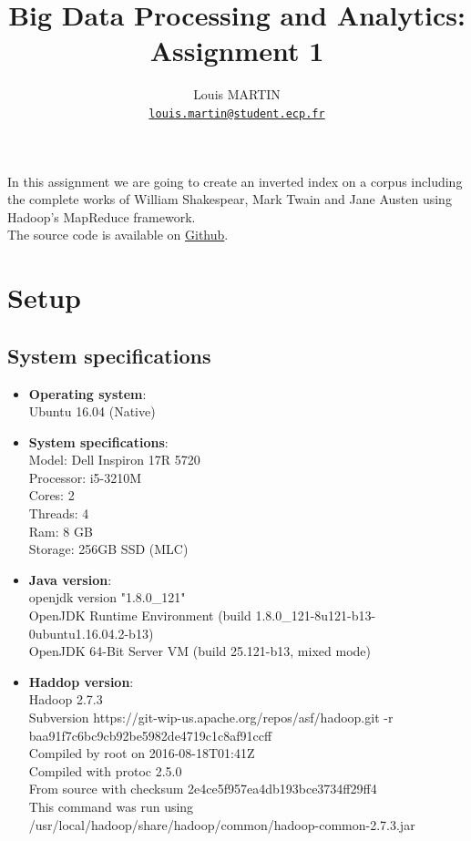 \documentclass[a4paper,10pt]{article}
\begin{document}
\title{Big Data Processing and Analytics: Assignment 1}
\author{Louis MARTIN\\
\href{mailto:louis.martin@student.ecp.fr}{\tt louis.martin@student.ecp.fr}}

\maketitle

In this assignment we are going to create an inverted index on a corpus
including the complete works of William Shakespear, Mark Twain and Jane Austen
using Hadoop's MapReduce framework.
\\The source code is available on \href{https://github.com/louismartin/bdpa}{Github}.


\section{Setup}
\subsection{System specifications}

\begin{itemize}
    \item \textbf{Operating system}:\\
    Ubuntu 16.04 (Native)
    \item \textbf{System specifications}:\\
    Model: Dell Inspiron 17R 5720\\
    Processor: i5-3210M\\
    Cores: 2\\
    Threads: 4\\
    Ram: 8 GB\\
    Storage: 256GB SSD (MLC)
    \item \textbf{Java version}:\\
    openjdk version "1.8.0\_121"\\
    OpenJDK Runtime Environment (build 1.8.0\_121-8u121-b13-0ubuntu1.16.04.2-b13)\\
    OpenJDK 64-Bit Server VM (build 25.121-b13, mixed mode)
    \item \textbf{Haddop version}:\\
    Hadoop 2.7.3\\
    Subversion https://git-wip-us.apache.org/repos/asf/hadoop.git -r baa91f7c6bc9cb92be5982de4719c1c8af91ccff\\
    Compiled by root on 2016-08-18T01:41Z\\
    Compiled with protoc 2.5.0\\
    From source with checksum 2e4ce5f957ea4db193bce3734ff29ff4\\
    This command was run using /usr/local/hadoop/share/hadoop/common/hadoop-common-2.7.3.jar\\

\end{itemize}
\end{document}
